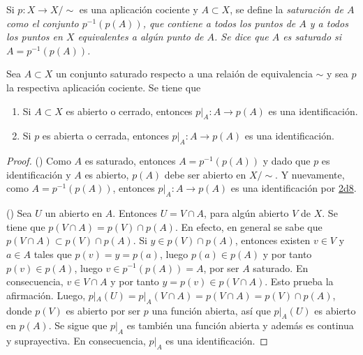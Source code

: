 
\begin{definition}
Si $p : X \longrightarrow X/\sim$ es una aplicación cociente y $A \subset X$, se define la \itshape{saturación} de $A$ como el conjunto $p^{-1}(p(A))$, que contiene a todos los puntos de $A$ y a todos los puntos en $X$ equivalentes a algún punto de $A$. Se dice que $A$ es \itshape{saturado} si $A = p^{-1}(p(A))$.
\end{definition}

\begin{proposition}
Sea $A \subset X$ un conjunto saturado respecto a una relaión de equivalencia $\sim$ y sea $p$ la respectiva aplicación cociente. Se tiene que
\begin{enumerate}[label=\textnormal{(\roman*)}]
\item Si $A \subset X$ es abierto o cerrado, entonces $p|_A : A \longrightarrow p(A)$ es una identificación.
\item Si $p$ es abierta o cerrada, entonces $p|_A : A \longrightarrow p(A)$ es una identificación.
\end{enumerate}
\end{proposition}

\begin{proof}
({}) Como $A$ es saturado, entonces $A = p^{-1}(p(A))$ y dado que $p$ es identificación y $A$ es abierto, $p(A)$ debe ser abierto en $X/\sim$. Y nuevamente, como $A = p^{-1}(p(A))$, entonces $p|_A : A \longrightarrow p(A)$ es una identificación por \hyperref[card:2d8]{\textsf{2d8}}.
\bigskip

({}) Sea $U$ un abierto en $A$. Entonces $U = V \cap A$, para algún abierto $V$ de $X$. Se tiene que $p(V \cap A) = p(V) \cap p(A)$. En efecto, en general se sabe que $p(V \cap A) \subset p(V) \cap p(A)$. Si $y \in p(V) \cap p(A)$, entonces existen $v \in V$ y $a \in A$ tales que $ p(v) = y = p(a)$, luego $p(a) \in p(A)$ y por tanto $p(v) \in p(A)$, luego $v \in p^{-1}(p(A)) = A$, por ser $A$ saturado. En consecuencia, $v \in V \cap A$ y por tanto $y = p(v) \in p(V \cap A)$. Esto prueba la afirmación. Luego, $p|_A(U) = p|_A(V \cap A) = p(V \cap A) = p(V) \cap p(A)$, donde $p(V)$ es abierto por ser $p$ una función abierta, así que $p|_A(U)$ es abierto en $p(A)$. Se sigue que $p|_A$ es también una función abierta y además es continua y suprayectiva. En consecuencia, $p|_A$ es una identificación.
\end{proof}
